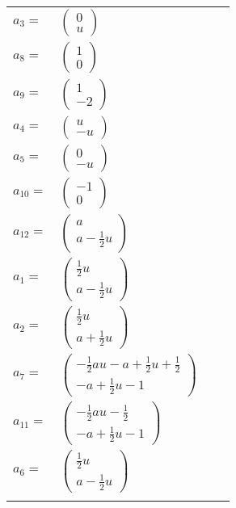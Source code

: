 \documentclass[1p]{elsarticle_modified}
\theoremstyle{definition}
\begin{document}
\begin{tabular}{m{7pt} m{180pt} m{7pt} m{180pt} }
\flushright $a_{3}=$&$\begin{pmatrix}0\\u\end{pmatrix}$ \\
\flushright $a_{8}=$&$\begin{pmatrix}1\\0\end{pmatrix}$ \\
\flushright $a_{9}=$&$\begin{pmatrix}1\\-2\end{pmatrix}$ \\
\flushright $a_{4}=$&$\begin{pmatrix}u\\- u\end{pmatrix}$ \\
\flushright $a_{5}=$&$\begin{pmatrix}0\\- u\end{pmatrix}$ \\
\flushright $a_{10}=$&$\begin{pmatrix}-1\\0\end{pmatrix}$ \\
\flushright $a_{12}=$&$\begin{pmatrix}a\\a-\frac{1}{2} u\end{pmatrix}$ \\
\flushright $a_{1}=$&$\begin{pmatrix}\frac{1}{2} u\\a-\frac{1}{2} u\end{pmatrix}$ \\
\flushright $a_{2}=$&$\begin{pmatrix}\frac{1}{2} u\\a+\frac{1}{2} u\end{pmatrix}$ \\
\flushright $a_{7}=$&$\begin{pmatrix}-\frac{1}{2} a u- a+\frac{1}{2} u+\frac{1}{2}\\- a+\frac{1}{2} u-1\end{pmatrix}$ \\
\flushright $a_{11}=$&$\begin{pmatrix}-\frac{1}{2} a u-\frac{1}{2}\\- a+\frac{1}{2} u-1\end{pmatrix}$ \\
\flushright $a_{6}=$&$\begin{pmatrix}\frac{1}{2} u\\a-\frac{1}{2} u\end{pmatrix}$\\&\end{tabular}
\end{document}
